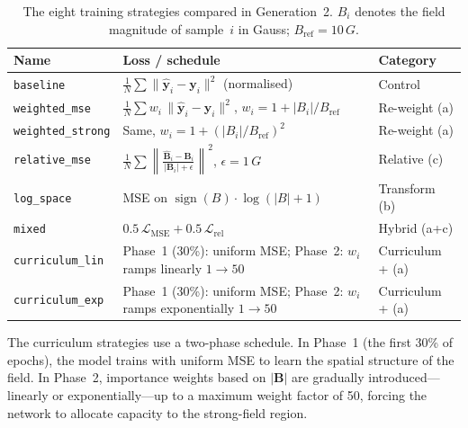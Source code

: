 \documentclass[11pt,a4paper]{article}
\newcommand{\SI}[2]{#1\,#2}
\begin{document}
\begin{table}[h]
    \centering
    \caption{The eight training strategies compared in Generation~2.
    $B_i$ denotes the field magnitude of sample~$i$ in Gauss;
    $B_{\text{ref}} = \SI{10}{G}$.}
    \label{tab:strategies}
    \small
    \begin{tabular}{lll}
        \toprule
        Name & Loss / schedule & Category \\
        \midrule
        \texttt{baseline}
            & $\frac{1}{N}\sum\lVert\hat{\mathbf{y}}_i - \mathbf{y}_i\rVert^2$
              (normalised)
            & Control \\[4pt]
        \texttt{weighted\_mse}
            & $\frac{1}{N}\sum w_i\,\lVert\hat{\mathbf{y}}_i - \mathbf{y}_i\rVert^2$,
              \; $w_i = 1 + |B_i|/B_{\text{ref}}$
            & Re-weight (a) \\[4pt]
        \texttt{weighted\_strong}
            & Same, $w_i = 1 + (|B_i|/B_{\text{ref}})^2$
            & Re-weight (a) \\[4pt]
        \texttt{relative\_mse}
            & $\frac{1}{N}\sum\left\lVert
              \frac{\hat{\mathbf{B}}_i - \mathbf{B}_i}
                   {|\mathbf{B}_i| + \epsilon}\right\rVert^2$,
              \; $\epsilon = \SI{1}{G}$
            & Relative (c) \\[4pt]
        \texttt{log\_space}
            & MSE on $\operatorname{sign}(B)\cdot\log(|B|+1)$
            & Transform (b) \\[4pt]
        \texttt{mixed}
            & $0.5\,\mathcal{L}_{\text{MSE}} + 0.5\,\mathcal{L}_{\text{rel}}$
            & Hybrid (a+c) \\[4pt]
        \texttt{curriculum\_lin}
            & Phase~1 (30\%): uniform MSE; \newline
              Phase~2: $w_i$ ramps linearly $1 \to 50$
            & Curriculum + (a) \\[4pt]
        \texttt{curriculum\_exp}
            & Phase~1 (30\%): uniform MSE; \newline
              Phase~2: $w_i$ ramps exponentially $1 \to 50$
            & Curriculum + (a) \\
        \bottomrule
    \end{tabular}
\end{table}

The curriculum strategies use a two-phase schedule.  In Phase~1
(the first 30\% of epochs), the model trains with uniform MSE to learn
the spatial structure of the field.  In Phase~2, importance weights
based on $|\mathbf{B}|$ are gradually introduced---linearly or
exponentially---up to a maximum weight factor of 50, forcing the
network to allocate capacity to the strong-field region.
\end{document}
